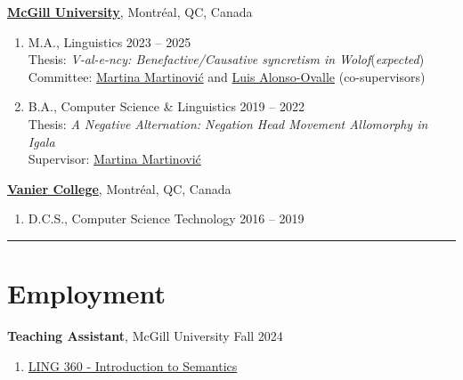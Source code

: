 \documentclass[margin,line]{resume}
\begin{document}
\begin{resume}
	\href{https://www.mcgill.ca/}{\textbf{McGill University}}, Montréal, QC, Canada
	\begin{enumerate}[-, leftmargin=1em, topsep=4pt]
		\item[] M.A., %
		      Linguistics%
		      \hfill 2023 -- 2025 \\
			  {\small Thesis: {\it V-al-e-ncy: Benefactive/Causative syncretism in Wolof}\hfill (\textit{expected})\\
			  Committee: \href{https://inamartinovic.com/}{Martina Martinović} and \href{https://people.linguistics.mcgill.ca/~luis.alonso-ovalle/}{Luis Alonso-Ovalle} (co-supervisors)}\vspace{0.2em}
		\item[] B.A., %
		      Computer Science %
		      \& %
		      Linguistics%
		      \hfill 2019 -- 2022\\
			  {\small Thesis: {\it A Negative Alternation: Negation Head Movement Allomorphy in Igala}\\
			  Supervisor: \href{https://inamartinovic.com/}{Martina Martinović}}
	\end{enumerate}

	\href{https://www.vaniercollege.qc.ca/}{\textbf{Vanier College}}, Montréal, QC, Canada
	\begin{enumerate}[-, leftmargin=1em, topsep=4pt]
		\item[]  D.C.S., Computer Science Technology \hfill 2016 -- 2019
	\end{enumerate}

	\vspace{-1.2em}\rule{\textwidth}{0.4pt}





	\section{\mysidestyle Employment}

	\textbf{Teaching Assistant}, 
	McGill University \hfill Fall 2024
	\begin{enumerate}[-, leftmargin=1em, topsep=4pt]
		\item[] \href{https://www.mcgill.ca/study/2024-2025/courses/ling-360}{LING 360 - Introduction to Semantics}
	\end{enumerate}


\end{resume}
\end{document}
